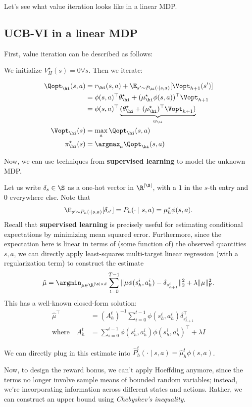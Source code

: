 \documentclass[\main/main]{subfiles}
\begin{document}
Let's see what value iteration looks like in a linear MDP.

\subsection{UCB-VI in a linear MDP}

First, value iteration can be described as follows:

We initialize $V_{H}^\star(s) = 0 \forall s$. Then we iterate:

\begin{align*}
    \Qopt_\hi(s, a) &= r_\hi(s, a) + \E_{s' \sim P_\hi(\cdot \mid s, a)} [\Vopt_{h+1}(s')] \\
    &= \phi(s, a)^\top \theta_\hi^\star + (\mu_\hi^\star \phi(s, a))^\top \Vopt_{h+1} \\
    &= \phi(s, a)^\top \underbrace{( \theta_\hi^\star + (\mu_\hi^\star)^\top  \Vopt_{h+1})}_{w_\hi} \\
    \Vopt_\hi(s) &= \max_a \Qopt_\hi(s, a) \\
    \pi^\star_\hi(s) &= \argmax_a \Qopt_\hi(s, a)
\end{align*}

Now, we can use techniques from \textbf{supervised learning} to model the unknown MDP.

Let us write $\delta_s \in \S$ as a one-hot vector in $\R^{|\S|}$, with a $1$ in the $s$-th entry and $0$ everywhere else.
Note that \[
\E_{s' \sim P_h(\cdot \mid s, a)} [\delta_{s'}] = P_h(\cdot \mid s, a) = \mu_h^\star \phi(s, a).
\]
Recall that \textbf{supervised learning} is precisely useful for estimating conditional expectations by minimizing mean squared error. Furthermore, since the expectation here is linear in terms of (some function of) the observed quantities $s, a$, we can directly apply least-squares multi-target linear regression (with a regularization term) to construct the estimate
\[
\hat \mu = \argmin_{\mu \in \R^{|\S| \times d}} \sum_{t=0}^{T-1} \|\mu \phi(s_h^i, a_h^i) - \delta_{s_{h+1}^i} \|_2^2 + \lambda \|\mu\|_{\text{F}}^2.
\]
This has a well-known closed-form solution:
\begin{align*}
    \hat \mu^\top &= (A_h^t)^{-1} \sum_{i=0}^{t-1} \phi(s_h^i, a_h^i) \delta_{s_{h+1}^i}^\top \\
    \text{where} \quad A_h^t &= \sum_{i=0}^{t-1} \phi(s_h^i, a_h^i) \phi(s_h^i, a_h^i)^\top + \lambda I
\end{align*}

We can directly plug in this estimate into $\hat{P}^t_h(\cdot \mid s, a) = \hat \mu^t_h \phi(s, a)$.

Now, to design the reward bonus, we can't apply Hoeffding anymore, since the terms no longer involve sample means of bounded random variables; instead, we're incorporating information across different states and actions. Rather, we can construct an upper bound using \emph{Chebyshev's inequality}.
\end{document}
